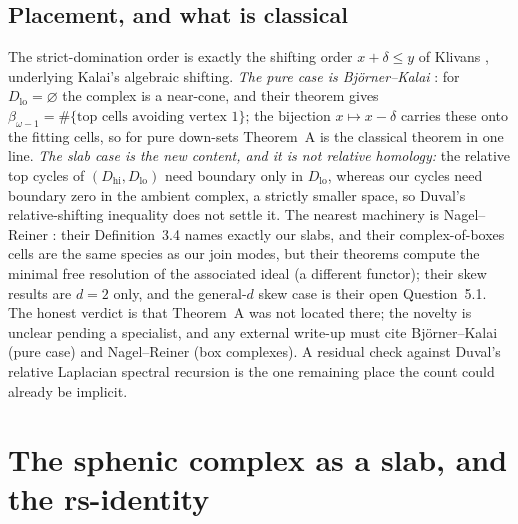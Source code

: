 \documentclass[11pt,reqno]{amsart}
\theoremstyle{plain}
\theoremstyle{definition}
\theoremstyle{plain}
\newcommand{\dd}{\delta}
\begin{document}
\subsection{Placement, and what is classical}
The strict-domination order is exactly the shifting order $x+\dd\le y$ of Klivans
\cite{Klivans}, underlying Kalai's algebraic shifting. \emph{The pure case is Björner--Kalai}
\cite{BjornerKalai}: for $D_{\mathrm{lo}}=\varnothing$ the complex is a near-cone, and their
theorem gives $\beta_{\omega-1}=\#\{\text{top cells avoiding vertex }1\}$; the bijection
$x\mapsto x-\dd$ carries these onto the fitting cells, so for pure down-sets Theorem~A is the
classical theorem in one line. \emph{The slab case is the new content, and it is not relative
homology:} the relative top cycles of $(D_{\mathrm{hi}},D_{\mathrm{lo}})$ need boundary only in
$D_{\mathrm{lo}}$, whereas our cycles need boundary zero in the ambient complex, a strictly
smaller space, so Duval's relative-shifting inequality \cite{DuvalRel} does not settle it. The
nearest machinery is Nagel--Reiner \cite{NagelReiner}: their Definition~3.4 names exactly our
slabs, and their complex-of-boxes cells are the same species as our join modes, but their
theorems compute the minimal free resolution of the associated ideal (a different functor);
their skew results are $d=2$ only, and the general-$d$ skew case is their open Question~5.1. The
honest verdict is that Theorem~A was not located there; the novelty is unclear pending a
specialist, and any external write-up must cite Björner--Kalai (pure case) and Nagel--Reiner
(box complexes). A residual check against Duval's relative Laplacian spectral recursion
\cite{DuvalLap} is the one remaining place the count could already be implicit.

\section{The sphenic complex as a slab, and the rs-identity}\label{sec:slabsphenic}
\end{document}
